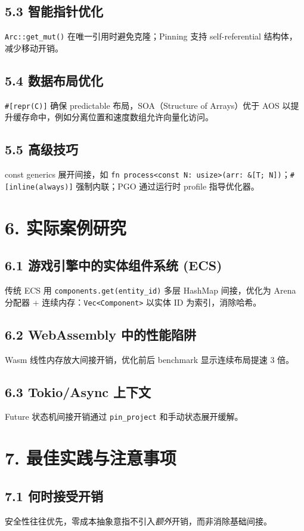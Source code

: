 \section{5.3 智能指针优化}
\texttt{Arc::get\_{}mut()} 在唯一引用时避免克隆；Pinning 支持 self-referential 结构体，减少移动开销。\par
\section{5.4 数据布局优化}
\texttt{\#{}[repr(C)]} 确保 predictable 布局，SOA（Structure of Arrays）优于 AOS 以提升缓存命中，例如分离位置和速度数组允许向量化访问。\par
\section{5.5 高级技巧}
const generics 展开间接，如 \texttt{fn process<const N: usize>(arr: \&{}[T; N])}；\texttt{\#{}[inline(always)]} 强制内联；PGO 通过运行时 profile 指导优化器。\par
\chapter{6. 实际案例研究}
\section{6.1 游戏引擎中的实体组件系统 (ECS)}
传统 ECS 用 \texttt{components.get(entity\_{}id)} 多层 HashMap 间接，优化为 Arena 分配器 + 连续内存：\texttt{Vec<Component>} 以实体 ID 为索引，消除哈希。\par
\section{6.2 WebAssembly 中的性能陷阱}
Wasm 线性内存放大间接开销，优化前后 benchmark 显示连续布局提速 3 倍。\par
\section{6.3 Tokio/Async 上下文}
Future 状态机间接开销通过 \texttt{pin\_{}project} 和手动状态展开缓解。\par
\chapter{7. 最佳实践与注意事项}
\section{7.1 何时接受开销}
安全性往往优先，零成本抽象意指不引入\textit{额外}开销，而非消除基础间接。\par
